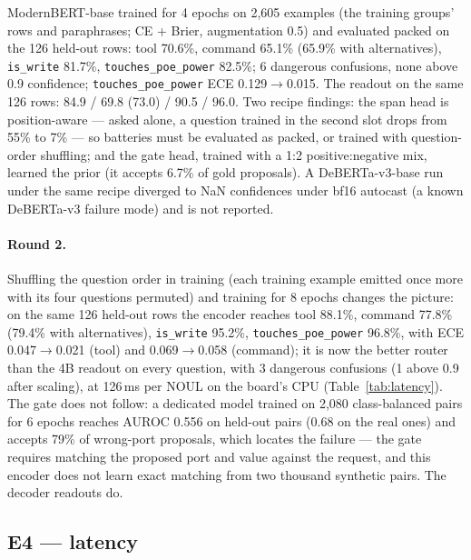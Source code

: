\documentclass[11pt]{article}
\begin{document}
ModernBERT-base trained for 4 epochs on 2,605 examples (the training groups' rows and paraphrases;
CE + Brier, augmentation 0.5) and evaluated packed on the 126 held-out rows: tool 70.6\%, command
65.1\% (65.9\% with alternatives), \texttt{is\_write} 81.7\%, \texttt{touches\_poe\_power}
82.5\%; 6 dangerous confusions, none above 0.9 confidence; \texttt{touches\_poe\_power} ECE
0.129$\to$0.015. The readout on the same 126 rows: 84.9 / 69.8 (73.0) / 90.5 / 96.0. Two
recipe findings: the span head is position-aware --- asked alone, a question trained in the
second slot drops from 55\% to 7\% --- so batteries must be evaluated as packed, or trained with
question-order shuffling; and the gate head, trained with a 1:2 positive:negative mix, learned
the prior (it accepts 6.7\% of gold proposals). A DeBERTa-v3-base run under the same recipe
diverged to NaN confidences under bf16 autocast (a known DeBERTa-v3 failure mode) and is not
reported.

\paragraph{Round 2.} Shuffling the question order in training (each training example emitted
once more with its four questions permuted) and training for 8 epochs changes the picture: on
the same 126 held-out rows the encoder reaches tool 88.1\%, command 77.8\% (79.4\% with
alternatives), \texttt{is\_write} 95.2\%, \texttt{touches\_poe\_power} 96.8\%, with ECE
0.047$\to$0.021 (tool) and 0.069$\to$0.058 (command); it is now the better router than the 4B
readout on every question, with 3 dangerous confusions (1 above 0.9 after scaling), at 126\,ms
per NOUL on the board's CPU (Table~\ref{tab:latency}). The gate does not follow: a dedicated model
trained on 2,080 class-balanced pairs for 6 epochs reaches AUROC 0.556 on held-out pairs (0.68 on
the real ones) and accepts 79\% of wrong-port proposals, which locates the failure --- the gate
requires matching the proposed port and value against the request, and this encoder does not
learn exact matching from two thousand synthetic pairs. The decoder readouts do.

\subsection{E4 --- latency}
\end{document}
